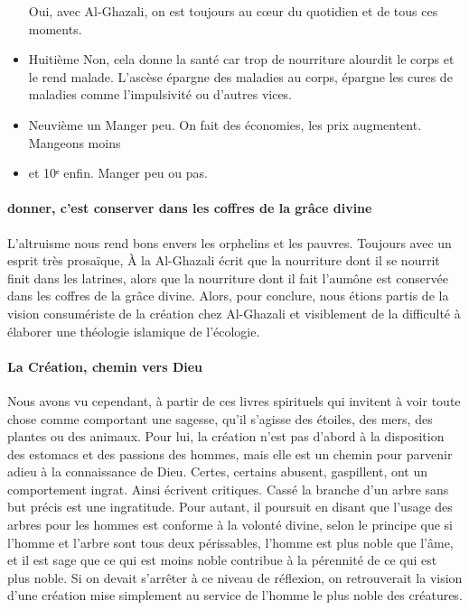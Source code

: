 \begin{itemize}
Oui, avec Al-Ghazali, on est toujours au cœur du quotidien et de tous ces moments.    \item Huitième Non, cela donne la santé car trop de nourriture alourdit le corps et le rend malade. L'ascèse épargne des maladies au corps, épargne les cures de maladies comme l'impulsivité ou d'autres vices.     \item Neuvième un Manger peu. On fait des économies, les prix augmentent. Mangeons moins     
\item et 10ᵉ enfin.
Manger peu ou pas.
\end{itemize}

\paragraph{donner, c'est conserver dans les coffres de la grâce divine}
 L'altruisme nous rend bons envers les orphelins et les pauvres. Toujours avec un esprit très prosaïque, À la Al-Ghazali écrit que la nourriture dont il se nourrit finit dans les latrines, alors que la nourriture dont il fait l'aumône est conservée dans les coffres de la grâce divine. Alors, pour conclure, nous étions partis de la vision consumériste de la création chez Al-Ghazali et visiblement de la difficulté à élaborer une théologie islamique de l'écologie.


 \paragraph{La Création, chemin vers Dieu}
Nous avons vu cependant, à partir de ces livres spirituels qui invitent à voir toute chose comme comportant une sagesse, qu'il s'agisse des étoiles, des mers, des plantes ou des animaux. Pour lui, la création n'est pas d'abord à la disposition des estomacs et des passions des hommes, mais elle est un chemin pour parvenir adieu à la connaissance de Dieu.
Certes, certains abusent, gaspillent, ont un comportement ingrat. Ainsi écrivent critiques. Cassé la branche d'un arbre sans but précis est une ingratitude. Pour autant, il poursuit en disant que l'usage des arbres pour les hommes est conforme à la volonté divine, selon le principe que si l'homme et l'arbre sont tous deux périssables, l'homme est plus noble que l'âme, et il est sage que ce qui est moins noble contribue à la pérennité de ce qui est plus noble.
Si on devait s'arrêter à ce niveau de réflexion, on retrouverait la vision d'une création mise simplement au service de l'homme le plus noble des créatures. 
